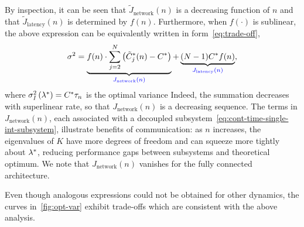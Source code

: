{%
By inspection, it can be seen that $ \tilde{J}_{\textrm{network}}(n) $ is a decreasing function of $n$
		and that $ \tilde{J}_\textrm{latency}(n) $ is determined by $ f(n) $.
		Furthermore, when $ f(\cdot) $ is sublinear,
		the above expression can be equivalently written in form~\eqref{eq:trade-off}, %
\begin{equation}\label{eq:cont-time-single-int-trade-off}
	\sigma^{2} = \underbrace{f(n)\cdot\sum_{j=2}^N\left(\tilde{C}_{j}^*(n)-C^*\right)}_{{\color{blue} J_{\textrm{network}}(n)}} + 
	\underbrace{(N-1)C^*f(n)}_{{\color{blue} J_{\textrm{latency}}(n)}},
\end{equation}
where $ \sigma^{2}_{\textit{I}}\left(\lambda^*\right) = C^*\tau_n $ is the optimal variance 
Indeed,
the summation decreases with superlinear rate,
so that $ J_{\textrm{network}}(n) $ is a decreasing sequence.
The terms in $ J_{\textrm{network}}(n) $,
each associated with a decoupled subsystem~\eqref{eq:cont-time-single-int-subsystem},
illustrate benefits of communication:
as $ n $ increases, the eigenvalues of $ K $ have more degrees of freedom
and can squeeze more tightly about $ \lambda^* $,
reducing performance gaps between subsystems and theoretical optimum.
We note that $ J_{\textrm{network}}(n) $ vanishes for the fully connected architecture.

{Even though analogous expressions could not be obtained for other dynamics,
	the curves in~\autoref{fig:opt-var} exhibit trade-offs which are consistent with the above analysis.}


}
